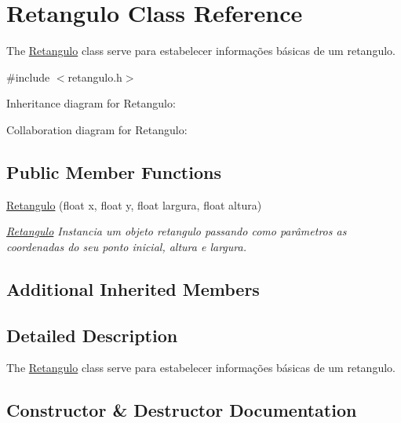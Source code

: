 \hypertarget{classRetangulo}{}\section{Retangulo Class Reference}
\label{classRetangulo}


The \hyperlink{classRetangulo}{Retangulo} class serve para estabelecer informações básicas de um retangulo.  




{\ttfamily \#include $<$retangulo.\+h$>$}



Inheritance diagram for Retangulo\+:


Collaboration diagram for Retangulo\+:
\subsection*{Public Member Functions}
\begin{DoxyCompactItemize}
\item 
\hyperlink{classRetangulo_acca1dd211eefc8dc04658c943c0d1122}{Retangulo} (float x, float y, float largura, float altura)
\begin{DoxyCompactList}\small\item\em \hyperlink{classRetangulo}{Retangulo} Instancia um objeto retangulo passando como parâmetros as coordenadas do seu ponto inicial, altura e largura. \end{DoxyCompactList}\end{DoxyCompactItemize}
\subsection*{Additional Inherited Members}


\subsection{Detailed Description}
The \hyperlink{classRetangulo}{Retangulo} class serve para estabelecer informações básicas de um retangulo. 

\subsection{Constructor \& Destructor Documentation}
\mbox{\label{classRetangulo_acca1dd211eefc8dc04658c943c0d1122}} 
